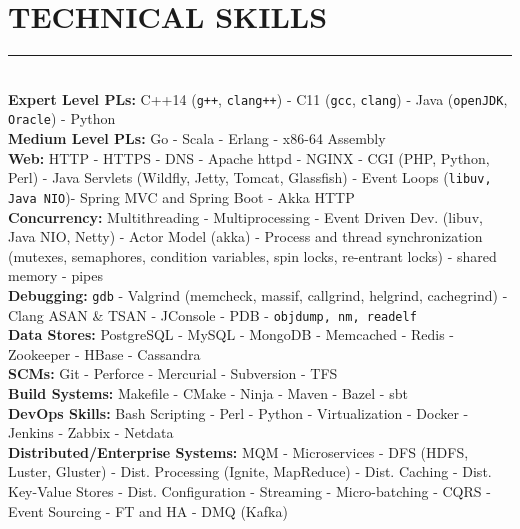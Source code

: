 \documentclass[10pt,a4paper]{article}
\begin{document}
\section{TECHNICAL SKILLS}
\noindent \rule {18.0cm}{0.2pt} \\
\noindent
\textbullet \hspace{0.1cm}\textbf{Expert Level PLs:} C++14 (\texttt{g++}, \texttt{clang++}) - C11 (\texttt{gcc}, \texttt{clang}) - Java (\texttt{openJDK}, \texttt{Oracle}) - Python \\
\textbullet \hspace{0.1cm}\textbf{Medium Level PLs:} Go - Scala - Erlang - x86-64 Assembly \\
\textbullet \hspace{0.1cm}\textbf{Web:} HTTP - HTTPS - DNS - Apache httpd - NGINX - CGI (PHP, Python, Perl) - Java Servlets (Wildfly, Jetty, Tomcat, Glassfish) - Event Loops (\texttt{libuv, Java NIO})- Spring MVC and Spring Boot - Akka HTTP \\
\textbullet \hspace{0.1cm}\textbf{Concurrency:} Multithreading - Multiprocessing - Event Driven Dev. (libuv, Java NIO, Netty) - Actor Model (akka) - Process and thread synchronization (mutexes, semaphores, condition variables, spin locks, re-entrant locks) - shared memory - pipes \\
\textbullet \hspace{0.1cm}\textbf{Debugging:} \texttt{gdb} - Valgrind (memcheck, massif, callgrind, helgrind, cachegrind) - Clang ASAN \& TSAN - JConsole - PDB - \texttt{objdump, nm, readelf} \\
\textbullet \hspace{0.1cm}\textbf{Data Stores:} PostgreSQL - MySQL - MongoDB - Memcached - Redis - Zookeeper - HBase - Cassandra \\
\textbullet \hspace{0.1cm}\textbf{SCMs:} Git - Perforce - Mercurial - Subversion - TFS \\
\textbullet \hspace{0.1cm}\textbf{Build Systems:} Makefile - CMake - Ninja - Maven - Bazel - sbt \\
\textbullet \hspace{0.1cm}\textbf{DevOps Skills:} Bash Scripting - Perl - Python - Virtualization - Docker - Jenkins - Zabbix - Netdata \\
\textbullet \hspace{0.1cm}\textbf{Distributed/Enterprise Systems:} MQM - Microservices - DFS (HDFS, Luster, Gluster) - Dist. Processing (Ignite, MapReduce) - Dist. Caching - Dist. Key-Value Stores - Dist. Configuration - Streaming - Micro-batching - CQRS - Event Sourcing - FT and HA - DMQ (Kafka)  \\
\end{document}
